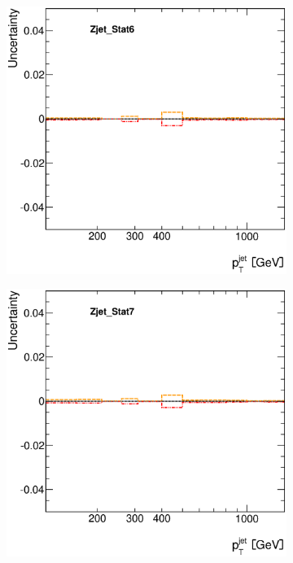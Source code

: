 \documentclass[12pt, twoside]{article}
\numberwithin{equation}{section}
\numberwithin{figure}{section}
\newenvironment{changemargin}[2]{%
\begin{list}{}{%
\setlength{\topsep}{0pt}%
\setlength{\leftmargin}{#1}%
\setlength{\rightmargin}{#2}%
\setlength{\listparindent}{\parindent}%
\setlength{\itemindent}{\parindent}%
\setlength{\parsep}{\parskip}%
}%
\item[]}{\end{list}}
\begin{document}
\begin{figure}[H]
\begin{changemargin}{-1.0cm}{-0.75cm}
\begin{changemargin}{-0.75cm}{-1.0cm}
        \begin{subfigure}[b]{0.25\textwidth}
            \includegraphics[width=\textwidth]{./images/JetSystematics/JetSystematic-53.eps}
        \end{subfigure}
        \begin{subfigure}[b]{0.25\textwidth}
            \includegraphics[width=\textwidth]{./images/JetSystematics/JetSystematic-54.eps}

\end{subfigure}
\end{changemargin}
\end{changemargin}
\end{figure}
\end{document}
